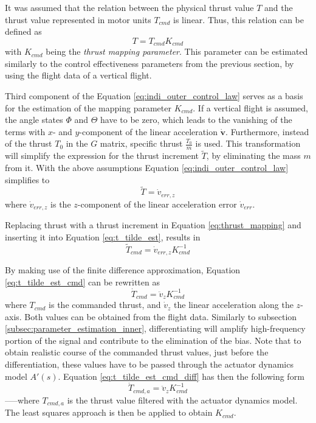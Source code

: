 \documentclass[11pt, a4paper, twoside]{report}
\begin{document}
It was assumed that the relation between the physical thrust value $T$ and the thrust value represented in motor units $T_{cmd}$ is linear. Thus, this relation can be defined as
\begin{equation}
	T = T_{cmd} K_{cmd}
	\label{eq:thrust_mapping}
\end{equation}
with $K_{cmd}$ being the \textit{thrust mapping parameter}. This parameter can be estimated similarly to the control effectiveness parameters from the previous section, by using the flight data of a vertical flight.

Third component of the Equation \ref{eq:indi_outer_control_law} serves as a basis for the estimation of the mapping parameter $K_{cmd}$. If a vertical flight is assumed, the angle states $\Phi$ and $\Theta$ have to be zero, which leads to the vanishing of the terms with $x$- and $y$-component of the linear acceleration $\bm{\dot{v}}$. Furthermore, instead of the thrust $T_0$ in the $G$ matrix, specific thrust $\frac{T_0}{m}$ is used. This transformation will simplify the expression for the thrust increment $\tilde{T}$, by eliminating the mass $m$ from it. With the above assumptions Equation \ref{eq:indi_outer_control_law}  simplifies to 
\begin{equation}
	\tilde{T} = \dot{v}_{err,z}
	\label{eq:t_tilde_est}
\end{equation}
where $\dot{v}_{err,z}$ is the $z$-component of the linear acceleration error $\dot{v}_{err}$.

Replacing thrust with a thrust increment in Equation \ref{eq:thrust_mapping} and inserting it into Equation \ref{eq:t_tilde_est}, results in
\begin{equation}
	\tilde{T}_{cmd} = \dot{v}_{err,z} K_{cmd}^{-1}
	\label{eq:t_tilde_est_cmd}
\end{equation}

By making use of the finite difference approximation, Equation \ref{eq:t_tilde_est_cmd} can be rewritten as
\begin{equation}
	\dot{T}_{cmd} = \ddot{v}_{z} K_{cmd}^{-1}
	\label{eq:t_tilde_est_cmd_diff}
\end{equation}
where $T_{cmd}$ is the commanded thrust, and $\dot{v}_{z}$ the linear acceleration along the $z$-axis. Both values can be obtained from the flight data. Similarly to subsection \ref{subsec:parameter_estimation_inner}, differentiating will amplify high-frequency portion of the signal and contribute to the elimination of the bias. Note that to obtain realistic course of the commanded thrust values, just before the differentiation, these values have to be passed through the actuator dynamics model $A'(s)$. Equation \ref{eq:t_tilde_est_cmd_diff} has then the following form 
\begin{equation}
	\dot{T}_{cmd, a} = \ddot{v}_{z} K_{cmd}^{-1}
	\label{eq:t_tilde_est_cmd_diff_actuator}
\end{equation}
–––where $T_{cmd, a}$ is the thrust value filtered with the actuator dynamics model. The least squares approach is then be applied to obtain $K_{cmd}$.
\end{document}
